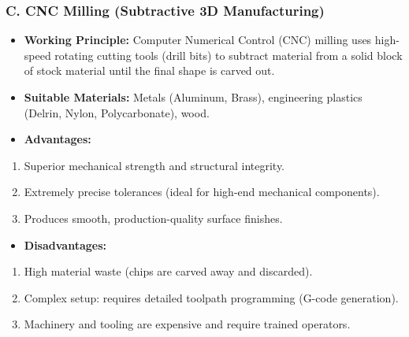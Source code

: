 \subsubsection{C. CNC Milling (Subtractive 3D Manufacturing)}
\begin{itemize}
  \item   \textbf{Working Principle:} Computer Numerical Control (CNC) milling uses high-speed rotating cutting tools (drill bits) to subtract material from a solid block of stock material until the final shape is carved out.
  \item   \textbf{Suitable Materials:} Metals (Aluminum, Brass), engineering plastics (Delrin, Nylon, Polycarbonate), wood.
  \item   \textbf{Advantages:}
\end{itemize}
\begin{enumerate}
  \item Superior mechanical strength and structural integrity.
  \item Extremely precise tolerances (ideal for high-end mechanical components).
  \item Produces smooth, production-quality surface finishes.
\end{enumerate}
\begin{itemize}
  \item   \textbf{Disadvantages:}
\end{itemize}
\begin{enumerate}
  \item High material waste (chips are carved away and discarded).
  \item Complex setup: requires detailed toolpath programming (G-code generation).
  \item Machinery and tooling are expensive and require trained operators.
\end{enumerate}

